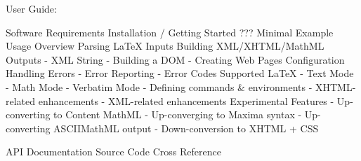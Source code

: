 User Guide:

Software Requirements
Installation / Getting Started ???
Minimal Example
Usage Overview
Parsing LaTeX Inputs
Building XML/XHTML/MathML Outputs
- XML String
- Building a DOM
- Creating Web Pages
Configuration
Handling Errors
- Error Reporting
- Error Codes
Supported LaTeX
- Text Mode
- Math Mode
- Verbatim Mode
- Defining commands & environments
- XHTML-related enhancements
- XML-related enhancements
Experimental Features
- Up-converting to Content MathML
- Up-converging to Maxima syntax
- Up-converting ASCIIMathML output
- Down-conversion to XHTML + CSS

API Documentation
Source Code Cross Reference
